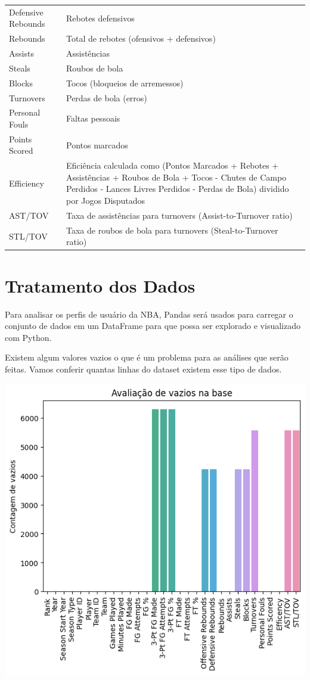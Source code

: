 \documentclass[
]{book}
\begin{document}
\begin{longtable}[]{@{}
  >{\raggedright\arraybackslash}p{}
  >{\raggedright\arraybackslash}p{}@{}}
Defensive Rebounds & Rebotes defensivos \\
Rebounds & Total de rebotes (ofensivos + defensivos) \\
Assists & Assistências \\
Steals & Roubos de bola \\
Blocks & Tocos (bloqueios de arremessos) \\
Turnovers & Perdas de bola (erros) \\
Personal Fouls & Faltas pessoais \\
Points Scored & Pontos marcados \\
Efficiency & Eficiência calculada como (Pontos Marcados + Rebotes + Assistências + Roubos de Bola + Tocos - Chutes de Campo Perdidos - Lances Livres Perdidos - Perdas de Bola) dividido por Jogos Disputados \\
AST/TOV & Taxa de assistências para turnovers (Assist-to-Turnover ratio) \\
STL/TOV & Taxa de roubos de bola para turnovers (Steal-to-Turnover ratio) \\
\bottomrule()
\end{longtable}

\hypertarget{tratamento-dos-dados}{%
\chapter{Tratamento dos Dados}\label{tratamento-dos-dados}}

Para analisar os perfis de usuário da NBA, Pandas será usados para carregar o conjunto de dados em um DataFrame para que possa ser explorado e visualizado com Python.

Existem algum valores vazios o que é um problema para as análises que serão feitas. Vamos conferir quantas linhas do dataset existem esse tipo de dados.

\includegraphics{imagens/1.png}
\end{document}

